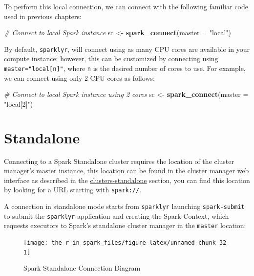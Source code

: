 \documentclass[]{book}
\newenvironment{Shaded}{\begin{snugshade}}{\end{snugshade}}
\newcommand{\CommentTok}[1]{\textcolor[rgb]{0.56,0.35,0.01}{\textit{#1}}}
\newcommand{\DataTypeTok}[1]{\textcolor[rgb]{0.13,0.29,0.53}{#1}}
\newcommand{\KeywordTok}[1]{\textcolor[rgb]{0.13,0.29,0.53}{\textbf{#1}}}
\newcommand{\NormalTok}[1]{#1}
\newcommand{\StringTok}[1]{\textcolor[rgb]{0.31,0.60,0.02}{#1}}
\theoremstyle{definition}
\theoremstyle{definition}
\theoremstyle{definition}
\theoremstyle{remark}
\begin{document}
To perform this local connection, we can connect with the following
familiar code used in previous chapters:

\begin{Shaded}
\begin{Highlighting}[]
\CommentTok{# Connect to local Spark instance}
\NormalTok{sc <-}\StringTok{ }\KeywordTok{spark_connect}\NormalTok{(}\DataTypeTok{master =} \StringTok{"local"}\NormalTok{)}
\end{Highlighting}
\end{Shaded}

By default, \texttt{sparklyr}, will connect using as many CPU cores are
available in your compute instance; however, this can be customized by
connecting using \texttt{master="local{[}n{]}"}, where \texttt{n} is the
desired number of cores to use. For example, we can connect using only 2
CPU cores as follows:

\begin{Shaded}
\begin{Highlighting}[]
\CommentTok{# Connect to local Spark instance using 2 cores}
\NormalTok{sc <-}\StringTok{ }\KeywordTok{spark_connect}\NormalTok{(}\DataTypeTok{master =} \StringTok{"local[2]"}\NormalTok{)}
\end{Highlighting}
\end{Shaded}

\hypertarget{standalone}{%
\section{Standalone}\label{standalone}}

Connecting to a Spark Standalone cluster requires the location of the
cluster manager's master instance, this location can be found in the
cluster manager web interface as described in the
\href{standalone\%20cluster}{clusters-standalone} section, you can find
this location by looking for a URL starting with \texttt{spark://}.

A connection in standalone mode starts from \texttt{sparklyr} launching
\texttt{spark-submit} to submit the \texttt{sparklyr} application and
creating the Spark Context, which requests executors to Spark's
standalone cluster manager in the \texttt{master} location:

\begin{figure}

{\centering \texttt{[image: the-r-in-spark\_files/figure-latex/unnamed-chunk-32-1]} 

}

\caption{Spark Standalone Connection Diagram}\label{fig:unnamed-chunk-32}
\end{figure}
\end{document}
